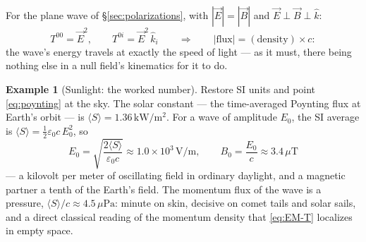 \documentclass[11pt]{article}
\theoremstyle{plain}
\theoremstyle{definition}
\newtheorem{example}[theorem]{Example}
\theoremstyle{remark}
\newcommand{\vE}{\vec{E}}
\newcommand{\vB}{\vec{B}}
\begin{document}
For the plane wave of \S\ref{sec:polarizations}, with
$|\vE| = |\vB|$ and $\vE \perp \vB \perp \hat k$:
\begin{equation}
  T^{00} = \vE^2,
  \qquad
  T^{0i} = \vE^2\,\hat k_i
  \qquad\Longrightarrow\qquad
  |\text{flux}| = (\text{density}) \times c :
\end{equation}
the wave's energy travels at exactly the speed of light --- as it
must, there being nothing else in a null field's kinematics for it
to do.

\begin{example}[Sunlight: the worked number]\label{ex:sunlight}
Restore SI units and point \eqref{eq:poynting} at the sky. The solar
constant --- the time-averaged Poynting flux at Earth's orbit --- is
$\langle S\rangle = 1.36\,\mathrm{kW/m^2}$. For a wave of amplitude
$E_0$, the SI average is
$\langle S\rangle = \tfrac12\varepsilon_0 c\, E_0^2$, so
\begin{equation}
  E_0 = \sqrt{\frac{2\langle S\rangle}{\varepsilon_0 c}}
  \approx 1.0\times 10^{3}\,\mathrm{V/m},
  \qquad
  B_0 = \frac{E_0}{c} \approx 3.4\,\mu\mathrm{T}
\end{equation}
--- a kilovolt per meter of oscillating field in ordinary daylight,
and a magnetic partner a tenth of the Earth's field. The momentum
flux of the wave is a pressure,
$\langle S\rangle/c \approx 4.5\,\mu\mathrm{Pa}$: minute on skin,
decisive on comet tails and solar sails, and a direct classical
reading of the momentum density that \eqref{eq:EM-T} localizes in
empty space.
\end{example}
\end{document}
